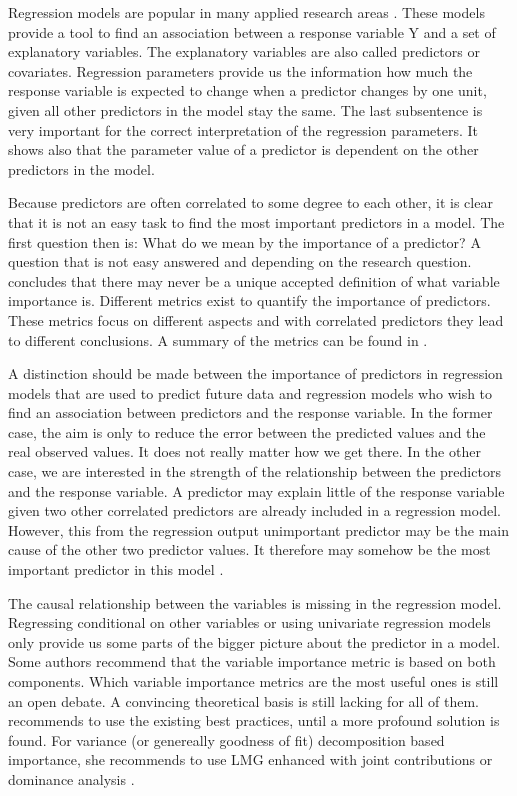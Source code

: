 \documentclass[11pt,a4paper,twoside]{book}\usepackage[]{graphicx}\usepackage[]{color}
\begin{document}
Regression models are popular in many applied research areas \citep{Nimon2013}. These models provide a tool to find an association between a response variable Y and a set of explanatory variables. The explanatory variables are also called predictors or covariates. Regression parameters provide us the information how much the response variable is expected to change when a predictor changes by one unit, given all other predictors in the model stay the same. The last subsentence is very important for the correct interpretation of the regression parameters. It shows also that the parameter value of a predictor is dependent on the other predictors in the model.

Because predictors are often correlated to some degree to each other, it is clear that it is not an easy task to find the most important predictors in a model. The first question then is: What do we  mean by the importance of a predictor? A question that is not easy answered and depending on the research question. \cite{Gromping2015} concludes that there may never  be a unique accepted definition of what variable importance is. Different metrics exist to quantify the importance of predictors. These metrics focus on different aspects and with correlated predictors they  lead to different conclusions.  A summary of the metrics can be found in  \cite{Gromping2015}.  

A distinction should be made between the importance of predictors in regression models that are used to predict future data and regression models who wish to find an association between predictors and the response variable. In the former case, the aim is only to reduce the error between the predicted values and the real observed values. It does not really matter how we get there. In the other case, we are interested in the strength of the relationship between the predictors and the response variable. A predictor may explain little of the response variable given two other correlated predictors are already included in a regression model. However, this from the regression output unimportant predictor may be the main cause of the other two predictor values.  It therefore may somehow be the most important predictor in this model \citep{Gromping2007}. 

The causal relationship between the variables is missing in the regression model. Regressing conditional on  other variables or using univariate regression models only provide us some parts of the bigger picture about the predictor in a model. Some authors recommend that the variable importance metric is based on both components.  Which variable importance metrics are the most useful ones is still an open debate. A convincing theoretical basis is still lacking for all of them.  \cite{Gromping2015} recommends to use the existing best practices, until a more profound solution is found. For variance (or genereally goodness of fit) decomposition based importance, she recommends to use LMG enhanced with joint contributions or dominance analysis \citep{Gromping2007}.  
\end{document}
